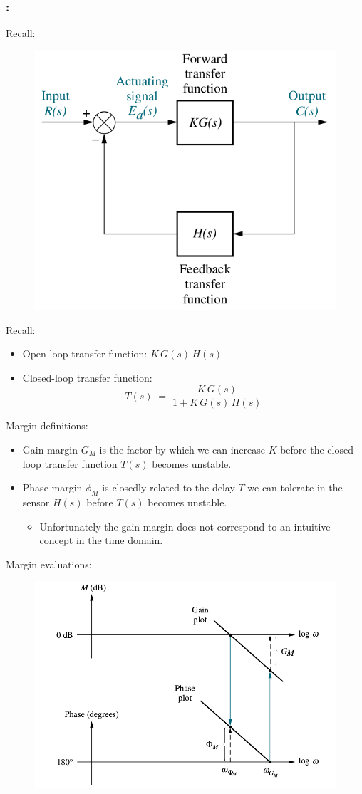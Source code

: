 \documentclass[ 10pt, xcolor = dvipsnames]{beamer}
\begin{document}
\begin{frame}[allowframebreaks]
\frametitle{\insertsection: \insertsubsection}

Recall: 
\begin{figure}
\centering
\includegraphics[width=0.5\columnwidth]{figures/Nise_Fig-8-1-a.jpg}
\end{figure}
\framebreak

Recall: 
\begin{itemize}
\item Open loop transfer function: $K \, G(s) \, H(s)$
\item Closed-loop transfer function: 
\[
T(s) \; = \; \frac{K \, G(s)}{1 + K \, G(s) \, H(s)}
\]
\end{itemize}

Margin definitions: 
\begin{itemize}
\item Gain margin $G_M$ is the factor by which we can increase $K$ before the closed-loop transfer function $T(s)$ becomes unstable. 
\item Phase margin $\phi_M$ is closedly related to the delay $T$ we can tolerate in the \linebreak sensor $H(s)$ before $T(s)$ becomes unstable. 
\begin{itemize}
\item Unfortunately the gain margin does not correspond to an intuitive concept \linebreak in the time domain. 
\end{itemize}
\end{itemize}
\framebreak

Margin evaluations: 
\begin{figure}
\centering
\includegraphics[width=0.68\columnwidth]{figures/Nise_Fig-10-37.jpg}
\end{figure}

\end{frame}
\end{document}
